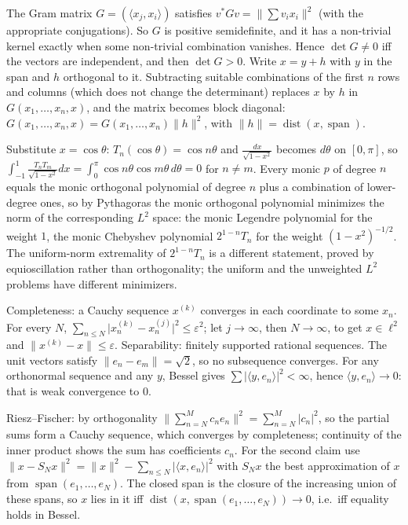 \documentclass[11pt,a4paper]{article}
\begin{document}
The Gram matrix \(G=(\langle x_j,x_i\rangle)\) satisfies \(v^*Gv=\bigl\lVert\sum v_ix_i\bigr\rVert^2\) (with the appropriate conjugations). So \(G\) is positive semidefinite, and it has a non-trivial kernel exactly when some non-trivial combination vanishes. Hence \(\det G\ne0\) iff the vectors are independent, and then \(\det G\gt0\).
Write \(x=y+h\) with \(y\) in the span and \(h\) orthogonal to it. Subtracting suitable combinations of the first \(n\) rows and columns (which does not change the determinant) replaces \(x\) by \(h\) in \(G(x_1,\dots,x_n,x)\), and the matrix becomes block diagonal: \(G(x_1,\dots,x_n,x)=G(x_1,\dots,x_n)\lVert h\rVert^2\), with \(\lVert h\rVert=\operatorname{dist}(x,\operatorname{span})\).

Substitute \(x=\cos\theta\): \(T_n(\cos\theta)=\cos n\theta\) and \(\frac{dx}{\sqrt{1-x^2}}\) becomes \(d\theta\) on \([0,\pi]\), so \(\int_{-1}^1\frac{T_nT_m}{\sqrt{1-x^2}}dx=\int_0^\pi\cos n\theta\cos m\theta\,d\theta=0\) for \(n\ne m\).
Every monic \(p\) of degree \(n\) equals the monic orthogonal polynomial of degree \(n\) plus a combination of lower-degree ones, so by Pythagoras the monic orthogonal polynomial minimizes the norm of the corresponding \(L^2\) space: the monic Legendre polynomial for the weight \(1\), the monic Chebyshev polynomial \(2^{1-n}T_n\) for the weight \((1-x^2)^{-1/2}\). The uniform-norm extremality of \(2^{1-n}T_n\) is a different statement, proved by equioscillation rather than orthogonality; the uniform and the unweighted \(L^2\) problems have different minimizers.

Completeness: a Cauchy sequence \(x^{(k)}\) converges in each coordinate to some \(x_n\). For every \(N\), \(\sum_{n\le N}\lvert x^{(k)}_n-x^{(j)}_n\rvert^2\le\varepsilon^2\); let \(j\to\infty\), then \(N\to\infty\), to get \(x\in\ell^2\) and \(\lVert x^{(k)}-x\rVert\le\varepsilon\). Separability: finitely supported rational sequences.
The unit vectors satisfy \(\lVert e_n-e_m\rVert=\sqrt2\), so no subsequence converges. For any orthonormal sequence and any \(y\), Bessel gives \(\sum\lvert\langle y,e_n\rangle\rvert^2\lt\infty\), hence \(\langle y,e_n\rangle\to0\): that is weak convergence to \(0\).

Riesz--Fischer: by orthogonality \(\bigl\lVert\sum_{n=N}^Mc_ne_n\bigr\rVert^2=\sum_{n=N}^M\lvert c_n\rvert^2\), so the partial sums form a Cauchy sequence, which converges by completeness; continuity of the inner product shows the sum has coefficients \(c_n\).
For the second claim use \(\lVert x-S_Nx\rVert^2=\lVert x\rVert^2-\sum_{n\le N}\lvert\langle x,e_n\rangle\rvert^2\) with \(S_Nx\) the best approximation of \(x\) from \(\operatorname{span}(e_1,\dots,e_N)\). The closed span is the closure of the increasing union of these spans, so \(x\) lies in it iff \(\operatorname{dist}(x,\operatorname{span}(e_1,\dots,e_N))\to0\), i.e.~iff equality holds in Bessel.
\end{document}
